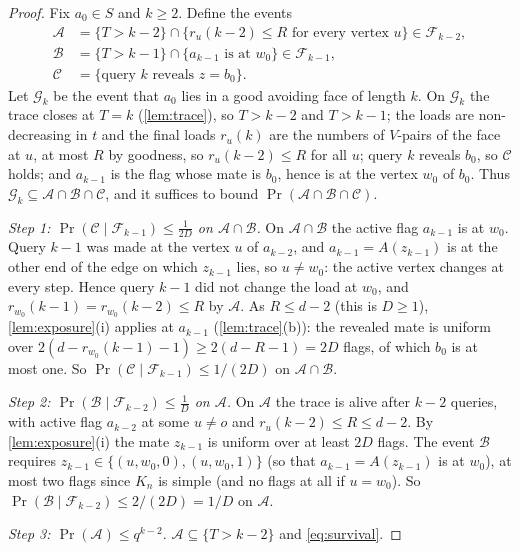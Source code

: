 \documentclass[11pt,a4paper]{article}
\theoremstyle{plain}
\theoremstyle{definition}
\theoremstyle{remark}
\newcommand{\cF}{\mathcal F}
\begin{document}
\label{pf:good}
\lemgood*
\begin{proof}
Fix $a_0\in S$ and $k\ge2$. Define the events
\begin{align*}
\mathcal A&=\{T>k-2\}\cap\{r_u(k-2)\le R\text{ for every vertex }u\}\in\cF_{k-2},\\
\mathcal B&=\{T>k-1\}\cap\{a_{k-1}\text{ is at }w_0\}\in\cF_{k-1},\\
\mathcal C&=\{\text{query $k$ reveals }z=b_0\}.
\end{align*}
Let $\mathcal G_k$ be the event that $a_0$ lies in a good avoiding face of length $k$. On $\mathcal G_k$ the trace closes at $T=k$ (\cref{lem:trace}), so $T>k-2$ and $T>k-1$; the loads are non-decreasing in $t$ and the final loads $r_u(k)$ are the numbers of $V$-pairs of the face at $u$, at most $R$ by goodness, so $r_u(k-2)\le R$ for all $u$; query $k$ reveals $b_0$, so $\mathcal C$ holds; and $a_{k-1}$ is the flag whose mate is $b_0$, hence is at the vertex $w_0$ of $b_0$. Thus $\mathcal G_k\subseteq\mathcal A\cap\mathcal B\cap\mathcal C$, and it suffices to bound $\Pr(\mathcal A\cap\mathcal B\cap\mathcal C)$.

\emph{Step 1: $\Pr(\mathcal C\mid\cF_{k-1})\le\frac1{2D}$ on $\mathcal A\cap\mathcal B$.} On $\mathcal A\cap\mathcal B$ the active flag $a_{k-1}$ is at $w_0$. Query $k-1$ was made at the vertex $u$ of $a_{k-2}$, and $a_{k-1}=A(z_{k-1})$ is at the other end of the edge on which $z_{k-1}$ lies, so $u\ne w_0$: the active vertex changes at every step. Hence query $k-1$ did not change the load at $w_0$, and $r_{w_0}(k-1)=r_{w_0}(k-2)\le R$ by $\mathcal A$. As $R\le d-2$ (this is $D\ge1$), \cref{lem:exposure}(i) applies at $a_{k-1}$ (\cref{lem:trace}(b)): the revealed mate is uniform over $2(d-r_{w_0}(k-1)-1)\ge2(d-R-1)=2D$ flags, of which $b_0$ is at most one. So $\Pr(\mathcal C\mid\cF_{k-1})\le1/(2D)$ on $\mathcal A\cap\mathcal B$.

\emph{Step 2: $\Pr(\mathcal B\mid\cF_{k-2})\le\frac1D$ on $\mathcal A$.} On $\mathcal A$ the trace is alive after $k-2$ queries, with active flag $a_{k-2}$ at some $u\ne o$ and $r_u(k-2)\le R\le d-2$. By \cref{lem:exposure}(i) the mate $z_{k-1}$ is uniform over at least $2D$ flags. The event $\mathcal B$ requires $z_{k-1}\in\{(u,w_0,0),(u,w_0,1)\}$ (so that $a_{k-1}=A(z_{k-1})$ is at $w_0$), at most two flags since $K_n$ is simple (and no flags at all if $u=w_0$). So $\Pr(\mathcal B\mid\cF_{k-2})\le2/(2D)=1/D$ on $\mathcal A$.

\emph{Step 3: $\Pr(\mathcal A)\le q^{k-2}$.} $\mathcal A\subseteq\{T>k-2\}$ and \eqref{eq:survival}.


\end{proof}
\end{document}
